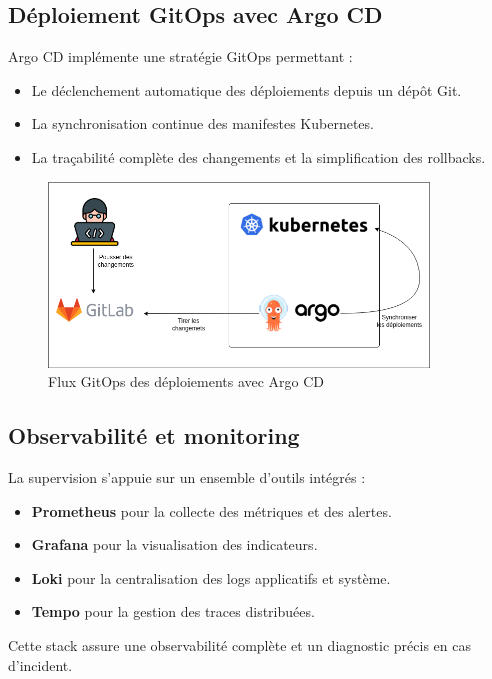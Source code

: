 \subsection*{Déploiement GitOps avec Argo CD}

Argo CD implémente une stratégie GitOps permettant :
\begin{itemize}
	\item Le déclenchement automatique des déploiements depuis un dépôt Git.
	\item La synchronisation continue des manifestes Kubernetes.
	\item La traçabilité complète des changements et la simplification des rollbacks.
\end{itemize}

\begin{figure}[H]
	\centering
	\includegraphics[width=0.9\textwidth]{figures/gitops-argo-cd.png}
	\caption{Flux GitOps des déploiements avec Argo CD}
\end{figure}

\subsection{Observabilité et monitoring}

La supervision s'appuie sur un ensemble d’outils intégrés :

\begin{itemize}
	\item \textbf{Prometheus} pour la collecte des métriques et des alertes.
	\item \textbf{Grafana} pour la visualisation des indicateurs.
	\item \textbf{Loki} pour la centralisation des logs applicatifs et système.
	\item \textbf{Tempo} pour la gestion des traces distribuées.
\end{itemize}

Cette stack assure une observabilité complète et un diagnostic précis en cas d’incident.

